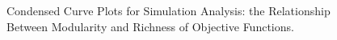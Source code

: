  \begin{figure}[!ht]
	\begin{center}
		\caption{Condensed Curve Plots for Simulation Analysis: the Relationship Between Modularity and Richness of Objective Functions.}
		\label{figure-FBA-results}
	\end{center}
\end{figure}